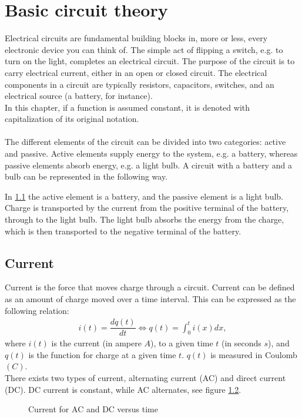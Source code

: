 \chapter{Basic circuit theory}
Electrical circuits are fundamental building blocks in, more or less, every electronic device you can think of. The simple act of flipping a switch, e.g. to turn on the light, completes an electrical circuit. The purpose of the circuit is to carry electrical current, either in an open or closed circuit. The electrical components in a circuit are typically resistors, capacitors,  switches, and an electrical 	source (a battery, for instance).
\\ 
In this chapter, if a function is assumed constant, it is denoted with capitalization of its original notation. 
\\ 
\\
The different elements of the circuit can be divided into two categories: active and passive. Active elements supply energy to the system, e.g. a battery, whereas passive elements absorb energy, e.g. a light bulb. A circuit with a battery and a bulb can be represented in the following way.
\begin{figure}[H]
 \label{bulb}
\end{figure} 
In \ref{bulb} the active element is a battery, and the passive element is a light bulb. Charge is transported by the current from the positive terminal of the battery, through to the light bulb. The light bulb absorbs the energy from the charge, which is then transported to the negative terminal of the battery.
\\
\section{Current}
Current is the force that moves charge through a circuit. Current can be defined as an amount of charge moved over a time interval. This can be expressed as the following relation:
\begin{align}
i(t)=\dfrac{dq(t)}{dt} \Leftrightarrow q(t)=\int_{0}^{t}i(x)dx,
\end{align}
where $i(t)$ is the current (in ampere $A$), to a given time $t$ (in seconds $s$), and $q(t)$ is the function for charge at a given time $t$. $q(t)$ is measured in Coulomb$(C)$.
\\
There exists two types of current, alternating current (AC) and direct current (DC). DC current is constant, while AC alternates, see figure \ref{fig:ACDC}. 
\begin{figure}[H] 

\caption{Current for AC and DC versus time}
\label{fig:ACDC}
\end{figure}
